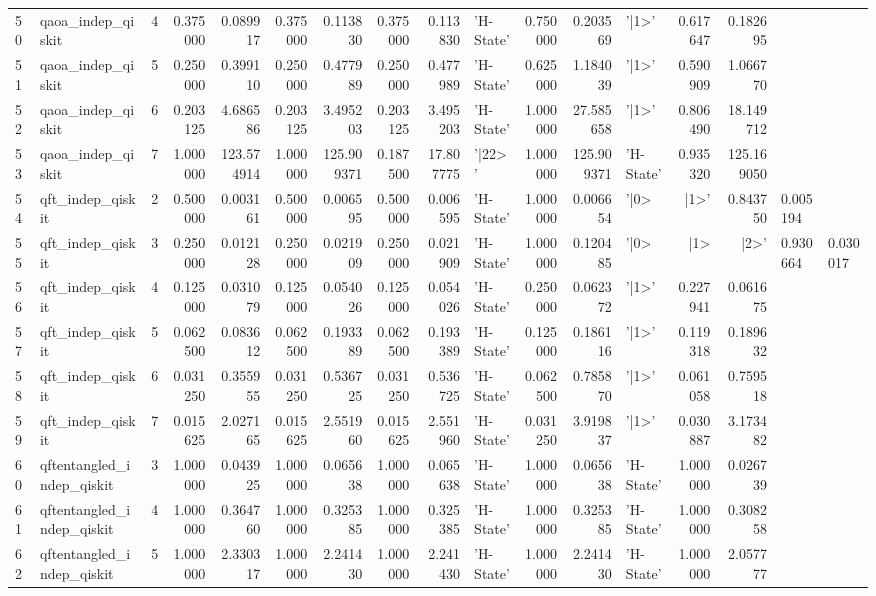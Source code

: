 \begin{table}
\begin{tabular}{llrrrrrrrlrrlrr}
50 & qaoa_indep_qiskit & 4 & 0.375000 & 0.089917 & 0.375000 & 0.113830 & 0.375000 & 0.113830 & 'H-State' & 0.750000 & 0.203569 & '|1>' & 0.617647 & 0.182695 \\
51 & qaoa_indep_qiskit & 5 & 0.250000 & 0.399110 & 0.250000 & 0.477989 & 0.250000 & 0.477989 & 'H-State' & 0.625000 & 1.184039 & '|1>' & 0.590909 & 1.066770 \\
52 & qaoa_indep_qiskit & 6 & 0.203125 & 4.686586 & 0.203125 & 3.495203 & 0.203125 & 3.495203 & 'H-State' & 1.000000 & 27.585658 & '|1>' & 0.806490 & 18.149712 \\
53 & qaoa_indep_qiskit & 7 & 1.000000 & 123.574914 & 1.000000 & 125.909371 & 0.187500 & 17.807775 & '|22>' & 1.000000 & 125.909371 & 'H-State' & 0.935320 & 125.169050 \\
54 & qft_indep_qiskit & 2 & 0.500000 & 0.003161 & 0.500000 & 0.006595 & 0.500000 & 0.006595 & 'H-State' & 1.000000 & 0.006654 & '|0> & |1>' & 0.843750 & 0.005194 \\
55 & qft_indep_qiskit & 3 & 0.250000 & 0.012128 & 0.250000 & 0.021909 & 0.250000 & 0.021909 & 'H-State' & 1.000000 & 0.120485 & '|0> & |1> & |2>' & 0.930664 & 0.030017 \\
56 & qft_indep_qiskit & 4 & 0.125000 & 0.031079 & 0.125000 & 0.054026 & 0.125000 & 0.054026 & 'H-State' & 0.250000 & 0.062372 & '|1>' & 0.227941 & 0.061675 \\
57 & qft_indep_qiskit & 5 & 0.062500 & 0.083612 & 0.062500 & 0.193389 & 0.062500 & 0.193389 & 'H-State' & 0.125000 & 0.186116 & '|1>' & 0.119318 & 0.189632 \\
58 & qft_indep_qiskit & 6 & 0.031250 & 0.355955 & 0.031250 & 0.536725 & 0.031250 & 0.536725 & 'H-State' & 0.062500 & 0.785870 & '|1>' & 0.061058 & 0.759518 \\
59 & qft_indep_qiskit & 7 & 0.015625 & 2.027165 & 0.015625 & 2.551960 & 0.015625 & 2.551960 & 'H-State' & 0.031250 & 3.919837 & '|1>' & 0.030887 & 3.173482 \\
60 & qftentangled_indep_qiskit & 3 & 1.000000 & 0.043925 & 1.000000 & 0.065638 & 1.000000 & 0.065638 & 'H-State' & 1.000000 & 0.065638 & 'H-State' & 1.000000 & 0.026739 \\
61 & qftentangled_indep_qiskit & 4 & 1.000000 & 0.364760 & 1.000000 & 0.325385 & 1.000000 & 0.325385 & 'H-State' & 1.000000 & 0.325385 & 'H-State' & 1.000000 & 0.308258 \\
62 & qftentangled_indep_qiskit & 5 & 1.000000 & 2.330317 & 1.000000 & 2.241430 & 1.000000 & 2.241430 & 'H-State' & 1.000000 & 2.241430 & 'H-State' & 1.000000 & 2.057777 \\

\end{tabular}
\end{table}
